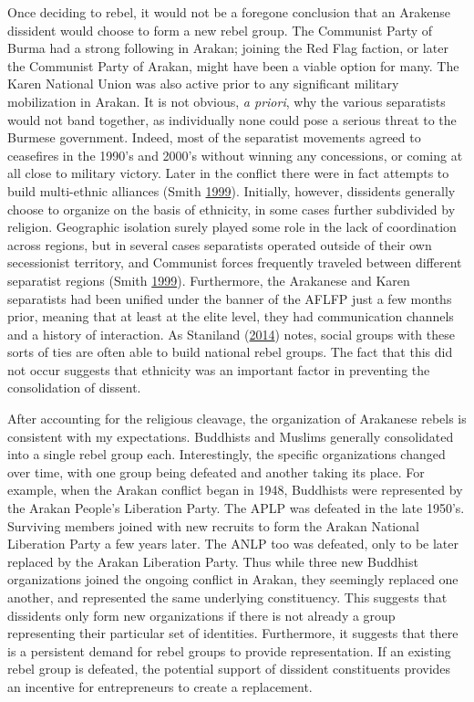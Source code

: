 \documentclass[12pt,]{book}
\theoremstyle{definition}
\theoremstyle{definition}
\theoremstyle{remark}
\begin{document}
Once deciding to rebel, it would not be a foregone conclusion that an
Arakense dissident would choose to form a new rebel group. The Communist
Party of Burma had a strong following in Arakan; joining the Red Flag
faction, or later the Communist Party of Arakan, might have been a
viable option for many. The Karen National Union was also active prior
to any significant military mobilization in Arakan. It is not obvious,
\emph{a priori}, why the various separatists would not band together, as
individually none could pose a serious threat to the Burmese government.
Indeed, most of the separatist movements agreed to ceasefires in the
1990's and 2000's without winning any concessions, or coming at all
close to military victory. Later in the conflict there were in fact
attempts to build multi-ethnic alliances (Smith
\protect\hyperlink{ref-Smith1999}{1999}). Initially, however, dissidents
generally choose to organize on the basis of ethnicity, in some cases
further subdivided by religion. Geographic isolation surely played some
role in the lack of coordination across regions, but in several cases
separatists operated outside of their own secessionist territory, and
Communist forces frequently traveled between different separatist
regions (Smith \protect\hyperlink{ref-Smith1999}{1999}). Furthermore,
the Arakanese and Karen separatists had been unified under the banner of
the AFLFP just a few months prior, meaning that at least at the elite
level, they had communication channels and a history of interaction. As
Staniland (\protect\hyperlink{ref-Staniland2014}{2014}) notes, social
groups with these sorts of ties are often able to build national rebel
groups. The fact that this did not occur suggests that ethnicity was an
important factor in preventing the consolidation of dissent.

After accounting for the religious cleavage, the organization of
Arakanese rebels is consistent with my expectations. Buddhists and
Muslims generally consolidated into a single rebel group each.
Interestingly, the specific organizations changed over time, with one
group being defeated and another taking its place. For example, when the
Arakan conflict began in 1948, Buddhists were represented by the Arakan
People's Liberation Party. The APLP was defeated in the late 1950's.
Surviving members joined with new recruits to form the Arakan National
Liberation Party a few years later. The ANLP too was defeated, only to
be later replaced by the Arakan Liberation Party. Thus while three new
Buddhist organizations joined the ongoing conflict in Arakan, they
seemingly replaced one another, and represented the same underlying
constituency. This suggests that dissidents only form new organizations
if there is not already a group representing their particular set of
identities. Furthermore, it suggests that there is a persistent demand
for rebel groups to provide representation. If an existing rebel group
is defeated, the potential support of dissident constituents provides an
incentive for entrepreneurs to create a replacement.
\end{document}
